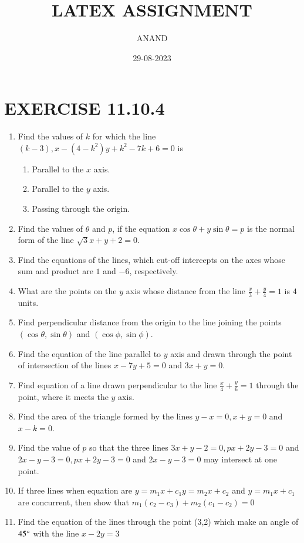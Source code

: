 \documentclass{article}
\theoremstyle{remark}
\begin{document}
\title{LATEX ASSIGNMENT}
\author{ANAND}
\date{29-08-2023}
\maketitle
\section*{EXERCISE 11.10.4}
\begin{enumerate}
\item Find the values of $k$ for which the line $(k-3), x-(4-k^2) y+k^2-7k+6=0$ is
\begin{enumerate} 
\item Parallel to the $x$ axis.
\item Parallel to the $y$ axis.
\item Passing through the origin.
\end{enumerate}
\item Find the values of $\theta$ and $p$, if the equation $x \cos \theta + y \sin \theta = p$ is the normal form of the line $\sqrt 3x+y+2=0$.
\item Find the equations of the lines, which cut-off intercepts on the axes whose sum and product are $1$ and $-6$, respectively.
\item What are the points on the $y$ axis whose distance from the line $\frac{x}{3}+\frac{y}{4}=1$ is $4$ units.
\item Find perpendicular distance from the origin to the line joining the points $(\cos \theta, \sin \theta)$ and $(\cos \phi, \sin \phi)$.
\item Find the equation of the line parallel to $y$ axis and drawn through the point of intersection of the lines $x-7y+5=0$ and $3x+y=0$.
\item Find equation of a line drawn perpendicular to the line $\frac{x}{4}+\frac{y}{6}=1$ through the point, where it meets the $y$ axis.
\item Find the area of the triangle formed by the lines $y-x=0, x+y=0$ and $x-k=0$.
\item Find the value of $p$ so that the three lines $3x+y-2=0, px+2y-3=0$ and $2x-y-3=0, px+2y-3=0$ and $2x-y-3=0$ may intersect at one point.
\item If three lines when equation are $y=m_1x+c_1y=m_2x+c_2$ and $y=m_1x+c_1$ are concurrent, then show that $m_1 (c_2-c_3)+m_2(c_1-c_2)=0$
\item Find the equation of the lines through the point (3,2) which make an angle of $45\degree$ with the line $x-2y = 3$

\end{enumerate}
\end{document}
